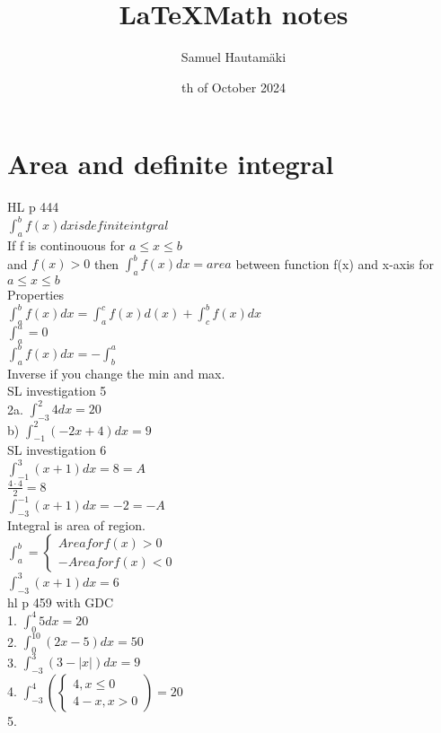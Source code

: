 \documentclass{article}
\title{\LaTeX Math notes}
\author{Samuel Hautamäki}
\date{th of October 2024}
\begin{document}
  \maketitle
   
  \section{Area and definite integral}
  HL p 444\\
  $\int_{a}^{b} f(x) dx is definite intgral$\\
  If f is continouous for $a\leq x \leq b$\\
  and $f(x)>0$ then $\int_{a}^{b} f(x) dx= area$ between function f(x) and x-axis for $a\leq x\leq b$\\
  Properties\\
  $\int_{a}^{b}f(x)dx = \int_{a}^{c}f(x) d(x)+\int_{c}^{b} f(x) dx$\\
  $\int_{a}^{a}=0$\\
  $\int_{a}^{b} f(x)dx=-\int_{b}^{a}$\\
  Inverse if you change the min and max.\\
  SL investigation 5\\
  2a. $\int_{-3}^{2}4dx=20$\\
  b) $\int_{-1}^{2}(-2x+4)dx=9$\\
  SL investigation 6\\
  $\int_{-1}^{3}(x+1) dx=8=A$\\
  $\frac{4\cdot4}{2}=8$\\
  $\int_{-3}^{-1}(x+1)dx=-2=-A$\\
  Integral is area of region.\\
  $\int_{a}^{b}=\begin{cases}
    Area for f(x)>0\\
    -Area for f(x)<0
  \end{cases}$\\
  $\int_{-3}^{3}(x+1)dx=6$\\
  hl p 459 with GDC\\
  1. $\int_{0}^{4}5dx=20$\\
  2. $\int_{0}^{10}(2x-5)dx=50$\\
  3. $\int_{-3}^{3}(3-|x|)dx=9$\\
  4. $\int_{-3}^{4}(\begin{cases}
    4, x\leq 0\\
    4-x,x>0
  \end{cases})=20$\\
  5. 
   
\end{document}
